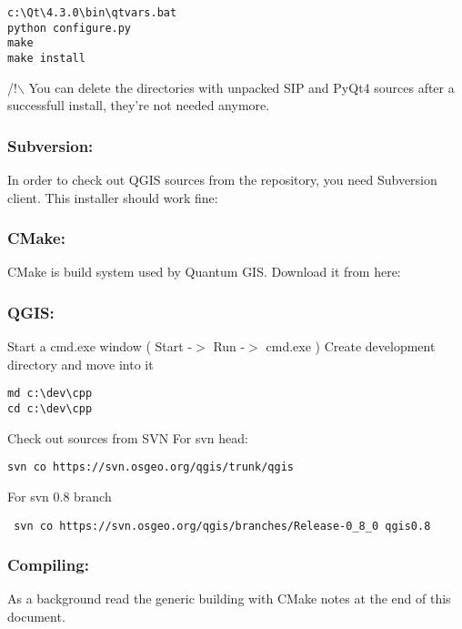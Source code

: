 \begin{verbatim}
c:\Qt\4.3.0\bin\qtvars.bat 
python configure.py 
make 
make install 
\end{verbatim}

/!$\backslash$ You can delete the directories with unpacked SIP and PyQt4 sources after a
successfull install, they're not needed anymore.

\subsubsection{Subversion:}
In order to check out QGIS sources from the repository, you need Subversion
client. This installer should work fine:


\subsubsection{CMake:}
CMake is build system used by Quantum GIS. Download it from here:


\subsubsection{QGIS:}
Start a cmd.exe window ( Start -$>$ Run -$>$ cmd.exe ) Create development 
directory and move into it

\begin{verbatim}
md c:\dev\cpp 
cd c:\dev\cpp 
\end{verbatim}

Check out sources from SVN For svn head:

\begin{verbatim}
svn co https://svn.osgeo.org/qgis/trunk/qgis 
\end{verbatim}
For svn 0.8 branch

\begin{verbatim}
 svn co https://svn.osgeo.org/qgis/branches/Release-0_8_0 qgis0.8
\end{verbatim}

\subsubsection{Compiling:}
As a background read the generic building with CMake notes at the end of 
this document.

